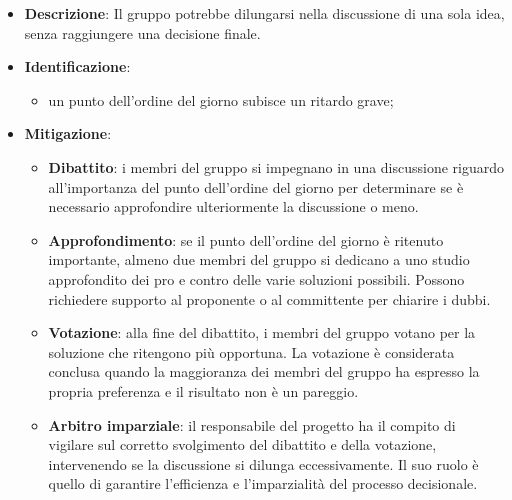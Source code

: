 \label{risk:conflitti decisionali}
\begin{itemize}
	\item \textbf{Descrizione}:
	      Il gruppo potrebbe dilungarsi nella discussione di una sola idea, senza
	      raggiungere una decisione finale.
	\item \textbf{Identificazione}:
	      \begin{itemize}
		      \item un punto dell'ordine del giorno subisce un ritardo grave;
	      \end{itemize}
	\item \textbf{Mitigazione}:
	      \begin{itemize}

		      \item \textbf{Dibattito}: i membri del gruppo si impegnano in una 
			  		discussione riguardo all'importanza del punto dell'ordine del 
					giorno per determinare se è necessario approfondire ulteriormente 
					la discussione o meno.

		      \item \textbf{Approfondimento}: se il punto dell'ordine del giorno è 
			  ritenuto importante, almeno due membri del gruppo si dedicano a uno studio 
			  approfondito dei pro e contro delle varie soluzioni possibili. 
			  Possono richiedere supporto al proponente o al committente per chiarire i dubbi.

		      \item \textbf{Votazione}: alla fine del dibattito, i membri del gruppo 
			  votano per la soluzione che ritengono più opportuna. 
			  La votazione è considerata conclusa quando la maggioranza dei membri 
			  del gruppo ha espresso la propria preferenza e il risultato non è un pareggio.

		      \item \textbf{Arbitro imparziale}: il responsabile del progetto ha il compito 
			  di vigilare sul corretto svolgimento del dibattito e della votazione, 
			  intervenendo se la discussione si dilunga eccessivamente. 
			  Il suo ruolo è quello di garantire l'efficienza e l'imparzialità del processo decisionale.
	      \end{itemize}
\end{itemize}
